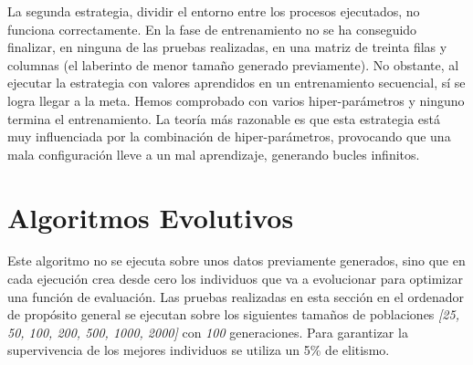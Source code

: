 				
		La segunda estrategia, dividir el entorno entre los procesos ejecutados, no funciona correctamente. En la fase de entrenamiento no se ha conseguido finalizar, en ninguna de las pruebas realizadas, en una matriz de treinta filas y columnas (el laberinto de menor tamaño generado previamente). No obstante, al ejecutar la estrategia con valores aprendidos en un entrenamiento secuencial, sí se logra llegar a la meta. Hemos comprobado con varios hiper-parámetros y ninguno termina el entrenamiento. La teoría más razonable es que esta estrategia está muy influenciada por la combinación de hiper-parámetros, provocando que una mala configuración lleve a un mal aprendizaje, generando bucles infinitos.
				
		
		
	
		
	
		

\section{Algoritmos Evolutivos}

	Este algoritmo no se ejecuta sobre unos datos previamente generados, sino que en cada ejecución crea desde cero los individuos que va a evolucionar para optimizar una función de evaluación. Las pruebas realizadas en esta sección en el ordenador de propósito general se ejecutan sobre los siguientes tamaños de poblaciones \textit{[25, 50, 100, 200, 500, 1000, 2000]} con \textit{100} generaciones. Para garantizar la supervivencia de los mejores individuos se utiliza un 5\% de elitismo. 
	
